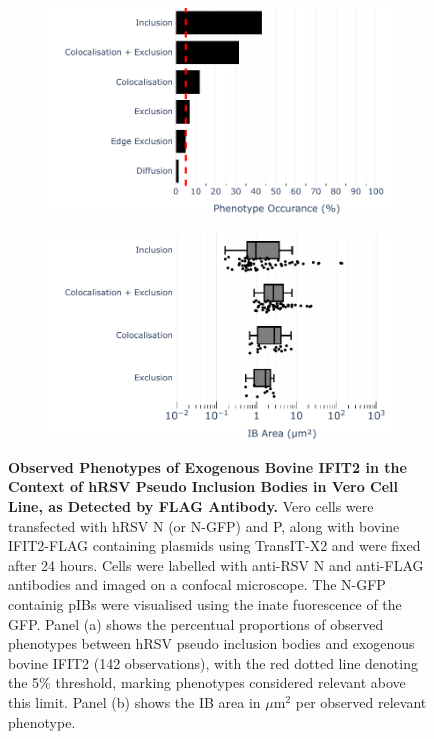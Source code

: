 \begin{figure}
    \begin{subfigure}{0.495\textwidth}
        \caption{}
        \includegraphics[width=1\linewidth]{09. Chapter 4/Figs/01. pIB/03. IFIT2/04. IFIT2-FLAG/03. FLAG/04. bar_bi2f_hnhp.pdf} 
    \end{subfigure}
    \begin{subfigure}{0.495\textwidth}
        \caption{}
        \includegraphics[width=1\linewidth]{09. Chapter 4/Figs/01. pIB/03. IFIT2/04. IFIT2-FLAG/03. FLAG/05. box_bi2f_hnhp.pdf}
    \end{subfigure}
    \caption[Observed Phenotypes of Exogenous Bovine IFIT2 in the Context of hRSV Pseudo Inclusion Bodies in Vero Cell Line, as Detected by FLAG Antibody.]{\textbf{Observed Phenotypes of Exogenous Bovine IFIT2 in the Context of hRSV Pseudo Inclusion Bodies in Vero Cell Line, as Detected by FLAG Antibody.} Vero cells were transfected with hRSV N (or N-GFP) and P, along with bovine IFIT2-FLAG containing plasmids using TransIT-X2 and were fixed after 24 hours. Cells were labelled with anti-RSV N and anti-FLAG antibodies and imaged on a confocal microscope. The N-GFP containig pIBs were visualised using the inate fuorescence of the GFP. Panel (a) shows the percentual proportions of observed phenotypes between hRSV pseudo inclusion bodies and exogenous bovine IFIT2 (142 observations), with the red dotted line denoting the 5\% threshold, marking phenotypes considered relevant above this limit. Panel (b) shows the IB area in \(\mu \mbox{m}^2\) per observed relevant phenotype.}
    \label{fig:Observed Phenotypes of Exogenous Bovine IFIT2 in the Context of hRSV Pseudo Inclusion Bodies in Vero Cell Line, as Detected by FLAG Antibody}
\end{figure}

